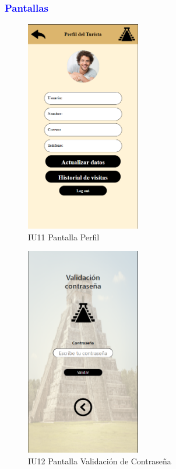 \subsubsection{\textcolor{blue}{Pantallas}}
\begin{figure}[htbp]
        \centering
        \includegraphics[width= 5cm]{entregable final/pantallasSistema/IU11 Pantalla Perfil.png}
    \caption{IU11 Pantalla Perfil}
        \label{fig:enter-label}
\end{figure}
\begin{figure}[htbp]
    \centering
    \includegraphics[width= 5cm]{entregable final/pantallasSistema/IU12 Pantalla Validación de Contraseña.png}
    \caption{IU12 Pantalla Validación de Contraseña}
    \label{fig:enter-label}
\end{figure}

